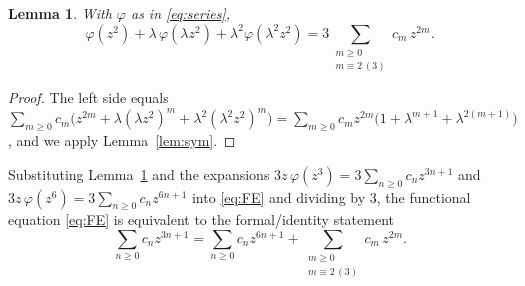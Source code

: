 \documentclass{amsart}
\newtheorem{lemma}{Lemma}
\theoremstyle{remark}
\begin{document}
\begin{lemma}\label{lem:terms}
With $\varphi$ as in \eqref{eq:series},
\[
\varphi(z^2)+\lambda\,\varphi(\lambda z^2)+\lambda^2\varphi(\lambda^2 z^2)
=3\!\!\sum_{\substack{m\ge 0\\ m\equiv 2\,(3)}}\!\! c_m\,z^{2m}.
\]
\end{lemma}
\begin{proof}
The left side equals
$\sum_{m\ge 0} c_m\bigl(z^{2m}+\lambda(\lambda z^2)^m+\lambda^2(\lambda^2 z^2)^m\bigr)
=\sum_{m\ge0}c_m z^{2m}\bigl(1+\lambda^{m+1}+\lambda^{2(m+1)}\bigr)$,
and we apply Lemma~\ref{lem:sym}.
\end{proof}

Substituting Lemma~\ref{lem:terms} and the expansions
$3z\,\varphi(z^3)=3\sum_{n\ge0}c_n z^{3n+1}$ and
$3z\,\varphi(z^6)=3\sum_{n\ge0}c_n z^{6n+1}$ into \eqref{eq:FE} and dividing by $3$, the
functional equation \eqref{eq:FE} is equivalent to the formal/identity statement
\begin{equation}\label{eq:three}
\sum_{n\ge0}c_n z^{3n+1}
=\sum_{n\ge0}c_n z^{6n+1}
+\!\!\sum_{\substack{m\ge0\\ m\equiv2\,(3)}}\!\! c_m\,z^{2m}.
\end{equation}
\end{document}
